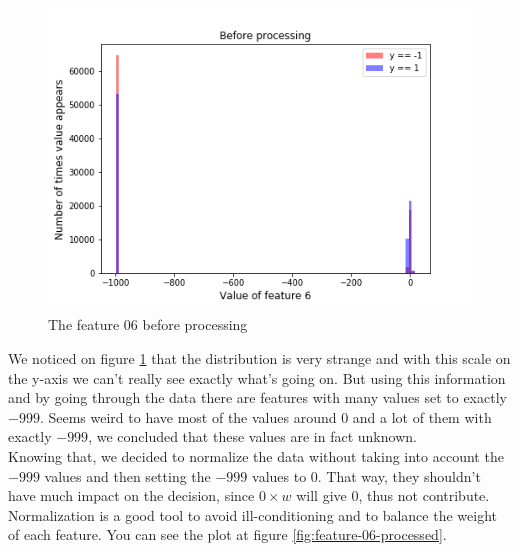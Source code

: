 \documentclass[10pt,conference,compsocconf]{IEEEtran}
\begin{document}
\begin{figure}[h!]
  \centering
  \includegraphics[width=\columnwidth]{graph-features/feature-06-raw.png}
  \caption{The feature 06 before processing}
	\label{fig:feature-06-raw}
\end{figure}

We noticed on figure \ref{fig:feature-06-raw} that the distribution is very strange and with this scale on the y-axis we can't really see exactly what's going on. But using this information and by going through the data there are features with many values set to exactly $-999$. Seems weird to have most of the values around 0 and a lot of them with exactly $-999$, we concluded that these values are in fact unknown.\\

Knowing that, we decided to normalize the data without taking into account the $-999$ values and then setting the $-999$ values to $0$. That way, they shouldn't have much impact on the decision, since $0 \times w$ will give 0, thus not contribute. Normalization is a good tool to avoid ill-conditioning and to balance the weight of each feature. You can see the plot at figure \ref{fig:feature-06-processed}.
\end{document}
